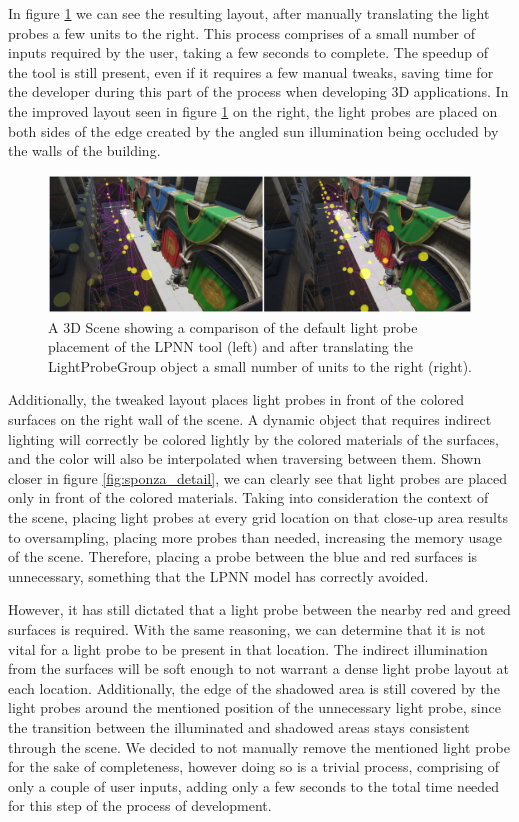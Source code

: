 In figure \ref{fig:comp6} we can see the resulting layout, after manually translating the light probes a few units to the right. This process comprises of a small number of inputs required by the user, taking a few seconds to complete. The speedup of the tool is still present, even if it requires a few manual tweaks, saving time for the developer during this part of the process when developing 3D applications. In the improved layout seen in figure \ref{fig:comp6} on the right, the light probes are placed on both sides of the edge created by the angled sun illumination being occluded by the walls of the building.\newline

\begin{figure}[H]
	\centering
	\includegraphics[width=\linewidth]{Graphics/results/concats/comparison5.png}
	\caption{A 3D Scene showing a comparison of the default light probe placement of the LPNN tool (left) and after translating the LightProbeGroup object a small number of units to the right (right).}
	\label{fig:comp6}
\end{figure}

Additionally, the tweaked layout places light probes in front of the colored surfaces on the right wall of the scene. A dynamic object that requires indirect lighting will correctly be colored lightly by the colored materials of the surfaces, and the color will also be interpolated when traversing between them. Shown closer in figure \ref{fig:sponza_detail}, we can clearly see that light probes are placed only in front of the colored materials. Taking into consideration the context of the scene, placing light probes at every grid location on that close-up area results to oversampling, placing more probes than needed, increasing the memory usage of the scene. Therefore, placing a probe between the blue and red surfaces is unnecessary, something that the LPNN model has correctly avoided. 

However, it has still dictated that a light probe between the nearby red and greed surfaces is required. With the same reasoning, we can determine that it is not vital for a light probe to be present in that location. The indirect illumination from the surfaces will be soft enough to not warrant a dense light probe layout at each location. Additionally, the edge of the shadowed area is still covered by the light probes around the mentioned position of the unnecessary light probe, since the transition between the illuminated and shadowed areas stays consistent through the scene. We decided to not manually remove the mentioned light probe for the sake of completeness, however doing so is a trivial process, comprising of only a couple of user inputs, adding only a few seconds to the total time needed for this step of the process of development.

